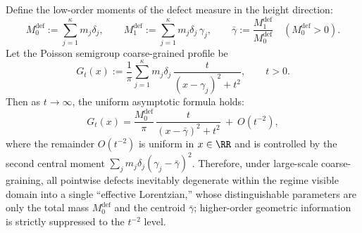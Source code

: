 \begin{proposition}\label{prop:xi-poisson-coarsegraining-nohair}
Define the low-order moments of the defect measure in the height direction:
\[
M_0^{\mathrm{def}}:=\sum_{j=1}^{\kappa}m_j\delta_j,\qquad
M_1^{\mathrm{def}}:=\sum_{j=1}^{\kappa}m_j\delta_j\,\gamma_j,\qquad
\bar\gamma:=\frac{M_1^{\mathrm{def}}}{M_0^{\mathrm{def}}}\quad(M_0^{\mathrm{def}}>0).
\]
Let the Poisson semigroup coarse-grained profile be
\[
G_t(x)
:=\frac{1}{\pi}\sum_{j=1}^{\kappa}m_j\delta_j\,\frac{t}{(x-\gamma_j)^2+t^2},
\qquad t>0.
\]
Then as \(t\to\infty\), the uniform asymptotic formula holds:
\[
\boxed{\;
G_t(x)
=\frac{M_0^{\mathrm{def}}}{\pi}\,\frac{t}{(x-\bar\gamma)^2+t^2}
\ +\ O(t^{-2}),\;}
\]
where the remainder \(O(t^{-2})\) is uniform in \(x\in\RR\) and is controlled by the second central moment
\(\sum_j m_j\delta_j(\gamma_j-\bar\gamma)^2\).
Therefore, under large-scale coarse-graining, all pointwise defects inevitably degenerate within the regime visible domain into a single ``effective Lorentzian,'' whose distinguishable parameters are only the total mass \(M_0^{\mathrm{def}}\) and the centroid \(\bar\gamma\); higher-order geometric information is strictly suppressed to the \(t^{-2}\) level.
\end{proposition}

